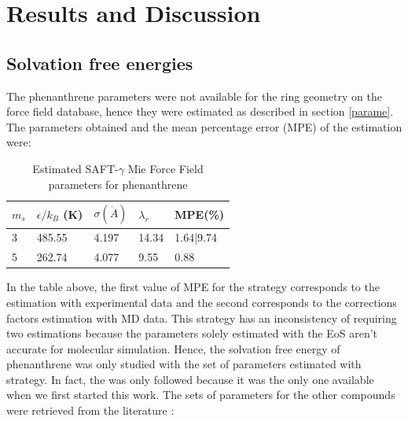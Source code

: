 \chapter{Results and Discussion} %

\label{Chapter5} %

\section{Solvation free energies}

The phenanthrene parameters were not available for the ring geometry on the force field database, hence they were estimated as described in section \ref{parame}. The parameters obtained and the mean percentage error (MPE) of the estimation were:

\begin{table}[h]
	\centering
	\caption{Estimated SAFT-$\gamma$ Mie Force Field parameters for phenanthrene}
	\label{tbl:estimparameters}
	\begin{tabular}{lllll}
		\hline
		 $m_s$ & $\epsilon/k_{B}$ (K) & $\sigma (\dot{A})$ & $\lambda_r$& MPE(\%) \\ \hline
		 3 \cite{lafitte2012}    & 485.55              & 4.197              & 14.34 & 1.64|9.74       \\ 
		 5  \cite{muller2017}   & 262.74               & 4.077              & 9.55   &  0.88   \\ \hline
	\end{tabular}
	
\end{table} 

In the table above, the first value of MPE for the  strategy corresponds to the estimation with experimental data and the second corresponds to the corrections factors estimation with MD data. This strategy has an inconsistency of requiring two estimations because the parameters solely  estimated with the EoS aren't accurate for molecular simulation. Hence, the solvation free energy of phenanthrene was only studied with the set of parameters estimated with  strategy. In fact, the \cite{lafitte2012} was only followed because it was the only one available when we first started this work. The sets of parameters for the other compounds were retrieved from the literature \cite{lobanova2016,herdes2015,ervik2016,muller2017}:

